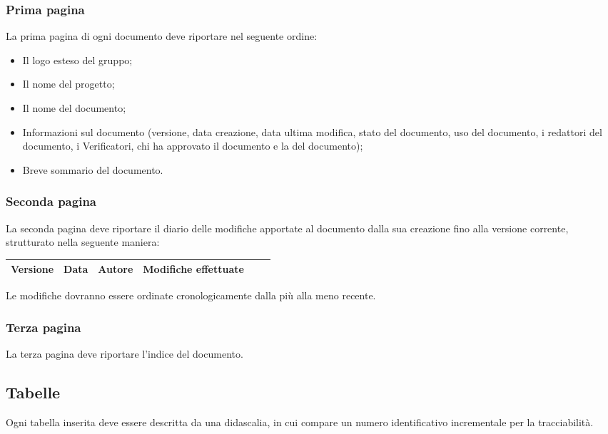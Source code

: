 \subsubsection{Prima pagina}
\label{5.2.3}
La prima pagina di ogni documento deve riportare nel seguente ordine:
\begin{itemize}
\item Il logo esteso del gruppo;
\item Il nome del progetto;
\item Il nome del documento;
\item Informazioni sul documento (versione, data creazione, data ultima modifica, stato del documento, uso del documento, i redattori del documento, i Verificatori, chi ha approvato il documento e la  del documento);
\item Breve sommario del documento.
\end{itemize}

\subsubsection{Seconda pagina}
\label{5.2.4}
La seconda pagina deve riportare il diario delle modifiche apportate al documento dalla sua creazione fino alla versione corrente, strutturato nella seguente maniera:

\begin{center}
\begin{longtable}{|c|c|c|p{0.5\linewidth}|}
\toprule
\textbf{Versione} & \textbf{Data} & \textbf{Autore} & \textbf{Modifiche effettuate}\\

\bottomrule
\end{longtable}
\end{center}
Le modifiche dovranno essere ordinate cronologicamente dalla più alla meno recente.


\subsubsection{Terza pagina}
\label{5.2.5}
La terza pagina deve riportare l'indice del documento.

\subsection{Tabelle}
Ogni tabella inserita deve essere descritta da una didascalia, in cui compare un numero identificativo incrementale per la tracciabilità.
